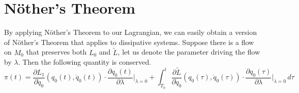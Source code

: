 \documentclass{amsart}
\begin{document}
\section{N\"other's Theorem}

By applying N\"other's Theorem to our Lagrangian, we can easily obtain a version of N\"other's Theorem that applies to dissipative systems.  Suppose there is a flow on $M_0$ that preserves both $L_0$ and $\tilde L$, let us denote the parameter driving the flow by $\lambda$.  Then the following quantity is conserved.
\begin{equation}
\pi(t) = \frac{\partial L_1}{\partial \dot q_0}(q_0(t),\dot q_0(t)) \cdot \frac{\partial q_0(t)}{\partial \lambda}\Big|_{\lambda = 0} + \int_{T_0}^t \frac{\partial \tilde L}{\partial \dot q_0}(q_0(\tau),\dot q_0(\tau)) \cdot \frac{\partial q_0(\tau)}{\partial \lambda}\Big|_{\lambda = 0} \, d\tau
\end{equation}
\end{document}
